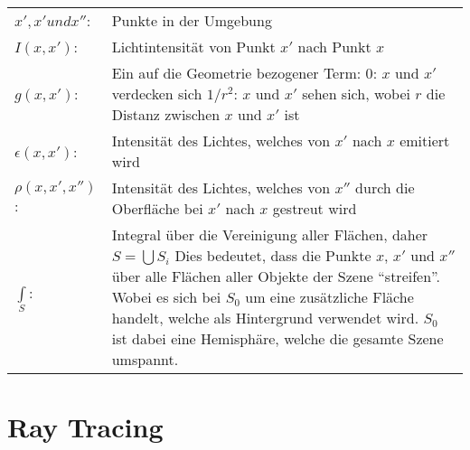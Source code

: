\begin{tabular}{ l l }
    $ x', x' und x''   $: & Punkte in der Umgebung                                                                                                  \\
    $ I(x, x')         $: & Lichtintensität von Punkt $x'$ nach Punkt $x$                                                                           \\
    $ g(x, x')         $: & \parbox[t]{14cm}{Ein auf die Geometrie bezogener Term:                                                                  \\
                                 \hspace*{12mm} $0$:     \hspace*{6mm} $x$ und $x'$ verdecken sich                                                  \\
                                 \hspace*{12mm} $1/r^2$: \hspace*{1mm} $x$ und $x'$ sehen sich, wobei $r$ die Distanz zwischen $x$ und $x'$ ist}    \\
    $ \epsilon(x, x')  $: & Intensität des Lichtes, welches von $x'$ nach $x$ emitiert wird                                                         \\
    $ \rho(x, x', x'') $: & Intensität des Lichtes, welches von $x''$ durch die Oberfläche bei $x'$ nach $x$ gestreut wird                          \\
    $ \int\limits_{S}  $: & \parbox[t]{14cm}{Integral über die Vereinigung aller Flächen, daher $ S = \bigcup{S_{i}} $                              \\
                            Dies bedeutet, dass die Punkte $x$, $x'$ und $x''$ über alle Flächen aller Objekte der Szene ``streifen''.              \\
                            Wobei es sich bei $S_{0}$ um eine zusätzliche Fläche handelt, welche als Hintergrund verwendet wird.                    \\
                            $S_{0}$ ist dabei eine Hemisphäre, welche die gesamte Szene umspannt.}                                                  \\
\end{tabular}


\section{Ray Tracing}
\label{sec:ray_tracing}


